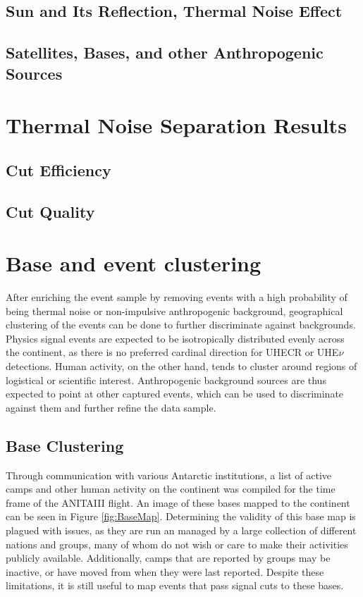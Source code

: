 	\subsection{Sun and Its Reflection, Thermal Noise Effect}
	\subsection{Satellites, Bases, and other Anthropogenic Sources}

\section{Thermal Noise Separation Results}
	\subsection{Cut Efficiency}
	\subsection{Cut Quality}




\section{Base and event clustering}
	
	After enriching the event sample by removing events with a high probability of being thermal noise or non-impulsive anthropogenic background, geographical clustering of the events can be done to further discriminate against backgrounds. Physics signal events are expected to be isotropically distributed evenly across the continent, as there is no preferred cardinal direction for UHECR or UHE$\nu$ detections.  Human activity, on the other hand, tends to cluster around regions of logistical or scientific interest.  Anthropogenic background sources are thus expected to point at other captured events, which can be used to discriminate against them and further refine the data sample. 

	\subsection{Base Clustering}
		Through communication with various Antarctic institutions, a list of active camps and other human activity on the continent was compiled for the time frame of the ANITAIII flight.  An image of these bases mapped to the continent can be seen in Figure \ref{fig:BaseMap}.  Determining the validity of this base map is plagued with issues, as they are run an managed by a large collection of different nations and groups, many of whom do not wish or care to make their activities publicly available.  Additionally, camps that are reported by groups may be inactive, or have moved from when they were last reported.  Despite these limitations, it is still useful to map events that pass signal cuts to these bases.
		
